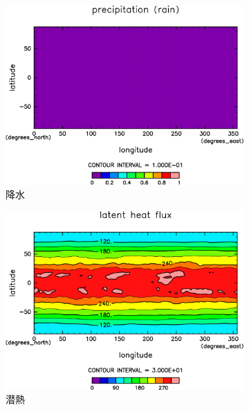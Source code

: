 \documentclass[body]{subfiles}
\begin{document}
\begin{figure}[t]
\begin{subfigure}{.4\textwidth}
		\includegraphics[width=\columnwidth]{S1500-nc/Rain,time=3650:4015-crop-rotate.pdf}
		\caption{降水\hmu*{[W/m^{-2}]}}\label{S1500nc降水}
	\end{subfigure}
	\begin{subfigure}{.4\textwidth}
		\centering
		\includegraphics[width=\columnwidth]{S1500-nc/Evap,time=3650:4015-crop-rotate.pdf}
		\caption{潜熱\hmu*{[W/m^{-2}]}}\label{S1500nc潜熱}
	\end{subfigure}
	\begin{subfigure}{.4\textwidth}
		\centering

\end{subfigure}
\end{figure}
\end{document}
